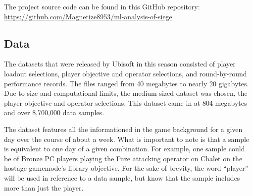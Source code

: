 \documentclass[12pt]{article}
\begin{document}
The project source code can be found in this GitHub repository:
\url{https://github.com/Magnetize8953/ml-analysis-of-siege}

\newpage

\subsection{Data}
The datasets that were released by Ubisoft in this season consisted of player loadout selections, player objective and operator selections, and round-by-round performance records.
The files ranged from 40 megabytes to nearly 20 gigabytes.
Due to size and computational limits, the medium-sized dataset was chosen, the player objective and operator selections.
This dataset came in at 804 megabytes and over 8,700,000 data samples.

The dataset features all the informationed in the game background for a given day over the course of about a week.
What is important to note is that a sample is equivalent to one day of a given combination.
For example, one sample could be of Bronze PC players playing the Fuze attacking operator on Chalet on the hostage gamemode's library objective.
For the sake of brevity, the word ``player'' will be used in reference to a data sample, but know that the sample includes more than just the player.

\newpage
\end{document}
